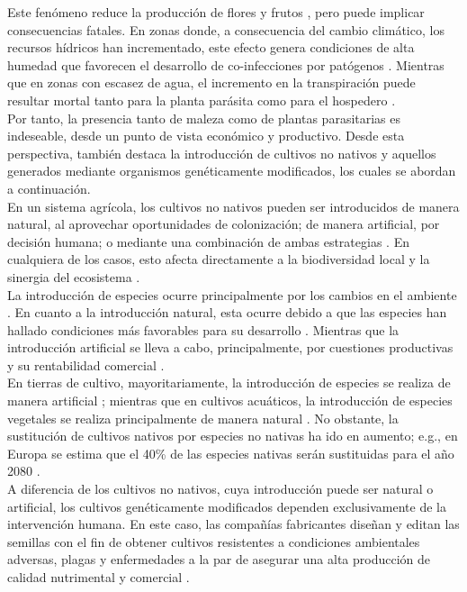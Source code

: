 \begin{itemize}[leftmargin=0cm, itemsep=0.5 cm]
	Este fenómeno reduce la producción de flores y frutos \cite{Watson_2022}, pero puede implicar consecuencias fatales. En zonas donde, a consecuencia del cambio climático, los recursos hídricos han incrementado, este efecto genera condiciones de alta humedad que favorecen el desarrollo de co-infecciones por patógenos \cite{Velasquez_2018}. Mientras que en zonas con escasez de agua, el incremento en la transpiración puede resultar mortal tanto para la planta parásita como para el hospedero \cite{Watson_2022}.\\
	
	Por tanto, la presencia tanto de maleza como de plantas parasitarias es indeseable, desde un punto de vista económico y productivo. Desde esta perspectiva, también destaca la introducción de cultivos no nativos y aquellos generados mediante organismos genéticamente modificados, los cuales se abordan a continuación.\\
	
	En un sistema agrícola, los cultivos no nativos pueden ser introducidos de manera natural, al aprovechar oportunidades de colonización; de manera artificial, por decisión humana; o mediante una combinación de ambas estrategias \cite{Webber_2012}. En cualquiera de los casos, esto afecta directamente a la biodiversidad local y la sinergia del ecosistema \cite{Sorte_2013}.\\
	
	La introducción de especies ocurre principalmente por los cambios en el ambiente \cite{Byers_2002}. En cuanto a la introducción natural, esta ocurre debido a que las especies han hallado condiciones más favorables para su desarrollo \cite{Sorte_2013}. Mientras que la introducción artificial se lleva a cabo, principalmente, por cuestiones productivas y su rentabilidad comercial \cite{Hodge_1956}.\\
	
	En tierras de cultivo, mayoritariamente, la introducción de especies se realiza de manera artificial \cite{Steen_2024}; mientras que en cultivos acuáticos, la introducción de especies vegetales se realiza principalmente de manera natural \cite{Sorte_2013}. No obstante, la sustitución de cultivos nativos por especies no nativas ha ido en aumento; e.g., en Europa se estima que el 40\% de las especies nativas serán sustituidas para el año 2080 \cite{Thuiller_2005}.\\
	
	A diferencia de los cultivos no nativos, cuya introducción puede ser natural o artificial, los cultivos genéticamente modificados dependen exclusivamente de la intervención humana. En este caso, las compañías fabricantes diseñan y editan las semillas con el fin de obtener cultivos resistentes a condiciones ambientales adversas, plagas y enfermedades \cite{Verma_2011} a la par de asegurar una alta producción de calidad nutrimental y comercial \cite{Cheng_2024}.\\
	

\end{itemize}
